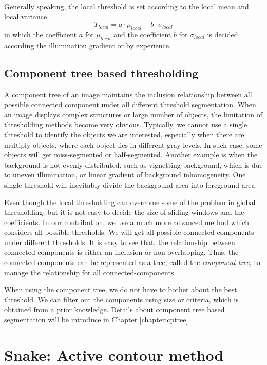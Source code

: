Generally speaking, the local threshold is set according to the local mean and local variance.
\begin{equation}
T_{local} = a\cdot\mu_{local} + b\cdot\sigma_{local}
\end{equation}
in which the coefficient $a$ for $\mu_{local}$ and the coefficient $b$ for $\sigma_{local}$ is decided according the illumination gradient or by experience.
\subsection{Component tree based thresholding} \label{sec:thresh-cptree}
A component tree of an image maintains the inclusion relationship between all possible connected component under all different threshold segmentation. When an image displays complex structures or large number of objects, the limitation of thresholding methods become very obvious. Typically, we cannot use a single threshold to identify the objects we are interested, especially when there are multiply objects, where each object lies in different gray levels. In such case, some objects will get miss-segmented or half-segmented. Another example is when the background is not evenly distributed, such as vignetting background, which is due to uneven illumination, or linear gradient of background inhomogeneity. One single threshold will inevitably divide the background area into foreground area.

Even though the local thresholding can overcome some of the problem in global thresholding, but it is not easy to decide the size of sliding windows and the coefficients. In our contribution, we use a much more advanced method which considers all possible thresholds. We will get all possible connected components under different thresholds. It is easy to see that, the relationship between connected components is either an inclusion or non-overlapping. Thus, the connected components can be represented as a tree, called the \emph{component tree}, to manage the relationship for all connected-components. 

When using the component tree, we do not have to bother about the best threshold. We can filter out the components using size or criteria, which is obtained from a prior knowledge. Details about component tree based segmentation will be introduce in Chapter \ref{chapter:cptree}.

\section{Snake: Active contour method} \label{sec:snake}

